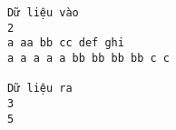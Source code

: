 \begin{verbatim}
Dữ liệu vào
2
a aa bb cc def ghi
a a a a a bb bb bb bb c c	

Dữ liệu ra
3
5
\end{verbatim}